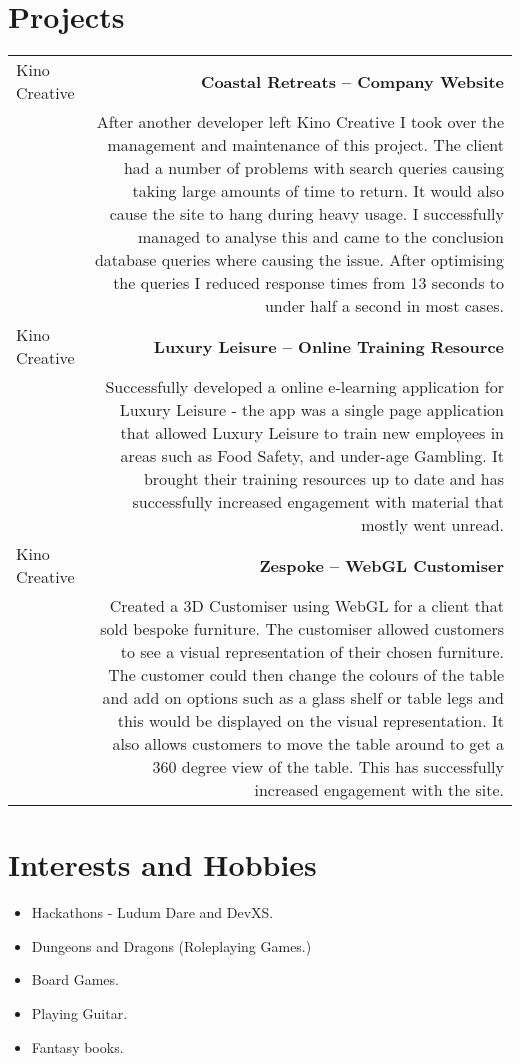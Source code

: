 \documentclass[10pt]{article}
\begin{document}
\section*{Projects}
\begin{tabular}{L!{\VRule}R}
Kino Creative&{\bf Coastal Retreats -- Company Website}\\
&After another developer left Kino Creative I took over the management and maintenance of this project. The client had a number of problems with search queries causing taking large amounts of time to return. It would also cause the site to hang during heavy usage. I successfully managed to analyse this and came to the conclusion database queries where causing the issue. After optimising the queries I reduced response times from 13 seconds to under half a second in most cases.\\
Kino Creative&{\bf Luxury Leisure -- Online Training Resource}\\
&Successfully developed a online e-learning application for Luxury Leisure - the app was a single page application that allowed Luxury Leisure to train new employees in areas such as Food Safety, and under-age Gambling. It brought their training resources up to date and has successfully increased engagement with material that mostly went unread.\\
Kino Creative&{\bf Zespoke -- WebGL Customiser}\\
&Created a 3D Customiser using WebGL for a client that sold bespoke furniture. The customiser allowed customers to see a visual representation of their chosen furniture. The customer could then change the colours of the table and add on options such as a glass shelf or table legs and this would be displayed on the visual representation. It also allows customers to move the table around to get a 360 degree view of the table. This has successfully increased engagement with the site.\\
\end{tabular}

\section*{Interests and Hobbies}
\begin{itemize}
\item Hackathons - Ludum Dare and DevXS.
\item Dungeons and Dragons (Roleplaying Games.)
\item Board Games.
\item Playing Guitar.
\item Fantasy books.
\end{itemize}
\end{document}
